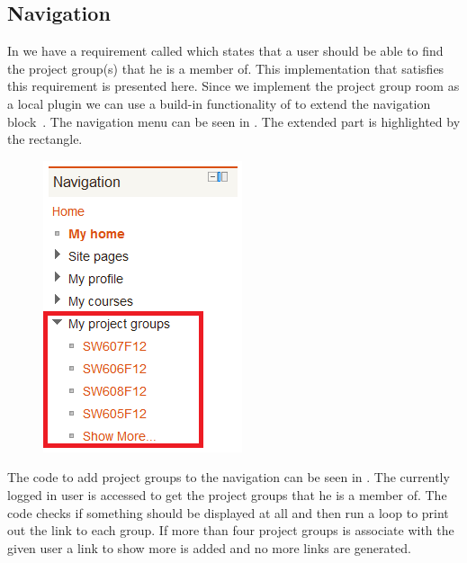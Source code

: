 	
	






\subsection{Navigation}
In  we have a requirement called  which states that a user should be able to find the project group(s) that he is a member of.
This implementation that satisfies this requirement is presented here.
Since we implement the project group room as a local plugin we can use a build-in functionality of \moodle{} to extend the navigation block~\cite{moodleextendnavigationblock}.
The navigation menu can be seen in .
The extended part is highlighted by the rectangle. 

\begin{figure}
	\centering
		\includegraphics[scale=0.7]{images/moodlenavigationblock.png}
	\label{fig:moodlenavigationblock}
\end{figure}

The code to add project groups to the navigation can be seen in .
The currently logged in user is accessed to get the project groups that he is a member of.
The code checks if something should be displayed at all and then run a loop to print out the link to each group. 
If more than four project groups is associate with the given user a link to show more is added and no more links are generated.


